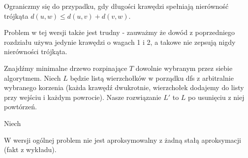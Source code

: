 Ograniczmy się do przypadku, gdy długości krawędzi spełniają nierówność trójkąta $d(u, w) \leqslant d(u, v) + d(v, w)$. 

Problem w tej wersji także jest \np{}trudny - zauważmy że dowód z poprzedniego rozdziału używa jedynie krawędzi o wagach 1 i 2, a takowe nie zepsują nigdy nierówności trójkąta.

Znajdźmy minimalne drzewo rozpinające $T$ dowolnie wybranym przez siebie algorytmem. Niech $L$ będzie listą wierzchołków w porządku dfs z arbitralnie wybranego korzenia (każda krawędź dwukrotnie, wierzchołek dodajemy do listy przy wejściu i każdym powrocie). Nasze rozwiązanie $L'$ to $L$ po usunięciu z niej powtórzeń. %

Niech 

W wersji ogólnej problem nie jest aproksymowalny z żadną stałą aproksymacji (fakt z wykładu).